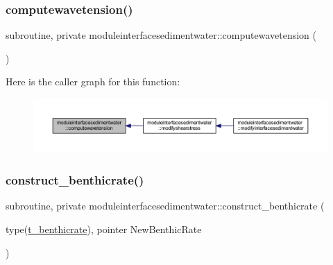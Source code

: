\subsubsection{\texorpdfstring{computewavetension()}{computewavetension()}}
{\footnotesize\ttfamily subroutine, private moduleinterfacesedimentwater\+::computewavetension (\begin{DoxyParamCaption}{ }\end{DoxyParamCaption})\hspace{0.3cm}{\ttfamily [private]}}

Here is the caller graph for this function\+:\nopagebreak
\begin{figure}[H]
\begin{center}
\leavevmode
\includegraphics[width=350pt]{namespacemoduleinterfacesedimentwater_a8334efc0d8743e6adfd52831e97bb260_icgraph}
\end{center}
\end{figure}
\mbox{\label{namespacemoduleinterfacesedimentwater_ab413235c8b7ada790b2fdaa8d3598925}} 
\subsubsection{\texorpdfstring{construct\+\_\+benthicrate()}{construct\_benthicrate()}}
{\footnotesize\ttfamily subroutine, private moduleinterfacesedimentwater\+::construct\+\_\+benthicrate (\begin{DoxyParamCaption}\item[{type(\mbox{\hyperlink{structmoduleinterfacesedimentwater_1_1t__benthicrate}{t\+\_\+benthicrate}}), pointer}]{New\+Benthic\+Rate }\end{DoxyParamCaption})\hspace{0.3cm}{\ttfamily [private]}}

